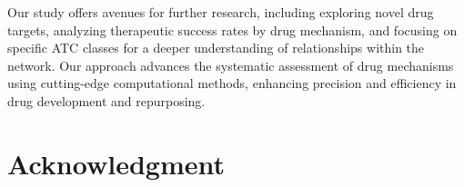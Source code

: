 \documentclass[journal,twoside,web]{ieeecolor}
\begin{document}
Our study offers avenues for further research, including exploring novel drug targets, analyzing therapeutic success rates by drug mechanism, and focusing on specific ATC classes for a deeper understanding of relationships within the network.
Our approach advances the systematic assessment of drug mechanisms using cutting-edge computational methods, enhancing precision and efficiency in drug development and repurposing.






\section*{Acknowledgment}



\end{document}
